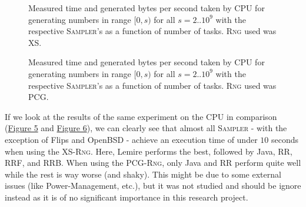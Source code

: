 \documentclass[a4paper]{scrartcl}
\begin{document}
\begin{figure}[!htb] \label{fig:5}
    \caption{
        Measured time and generated bytes per second taken by CPU for generating numbers in range $[0,s)$ for all $s = 2..10^9$ with the respective \textsc{Sampler}'s as a function of number of tasks. \textsc{Rng} used was XS.    
    } 
\end{figure}


\begin{figure}[!htb] \label{fig:6}
    \caption{
        Measured time and generated bytes per second taken by CPU for generating numbers in range $[0,s)$ for all $s = 2..10^9$ with the respective \textsc{Sampler}'s as a function of number of tasks. \textsc{Rng} used was PCG.    
    }   
\end{figure}

\clearpage
If we look at the results of the same experiment on the CPU in comparison (\hyperref[fig:5]{Figure 5} and \hyperref[fig:6]{Figure 6}), we can clearly see that almost all \textsc{Sampler} - with the exception of Flips and OpenBSD - achieve an execution time of under $10$ seconds when using the XS-\textsc{Rng}.
Here, Lemire performs the best, followed by Java, RR, RRF, and RRB.
When using the PCG-\textsc{Rng}, only Java and RR perform quite well while the rest is way worse (and shaky). 
This might be due to some external issues (like Power-Management, etc.), but it was not studied and should be ignore instead as it is of no significant importance in this research project.

\printbibliography
\end{document}
